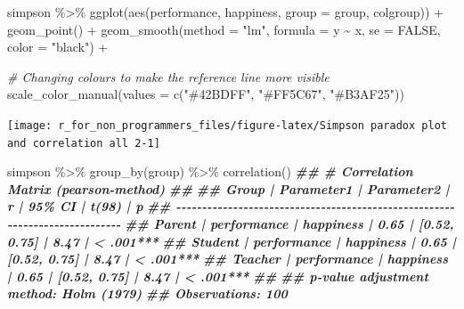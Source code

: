 \documentclass[
]{book}
\newenvironment{Shaded}{\begin{snugshade}}{\end{snugshade}}
\newcommand{\AttributeTok}[1]{\textcolor[rgb]{0.77,0.63,0.00}{#1}}
\newcommand{\CommentTok}[1]{\textcolor[rgb]{0.56,0.35,0.01}{\textit{#1}}}
\newcommand{\ConstantTok}[1]{\textcolor[rgb]{0.00,0.00,0.00}{#1}}
\newcommand{\DocumentationTok}[1]{\textcolor[rgb]{0.56,0.35,0.01}{\textbf{\textit{#1}}}}
\newcommand{\FunctionTok}[1]{\textcolor[rgb]{0.00,0.00,0.00}{#1}}
\newcommand{\NormalTok}[1]{#1}
\newcommand{\SpecialCharTok}[1]{\textcolor[rgb]{0.00,0.00,0.00}{#1}}
\newcommand{\StringTok}[1]{\textcolor[rgb]{0.31,0.60,0.02}{#1}}
\begin{document}
\begin{Shaded}
\begin{Highlighting}[]
\NormalTok{simpson }\SpecialCharTok{\%\textgreater{}\%}
  \FunctionTok{ggplot}\NormalTok{(}\FunctionTok{aes}\NormalTok{(performance, happiness, }\AttributeTok{group =}\NormalTok{ group, colgroup)) }\SpecialCharTok{+}
  \FunctionTok{geom\_point}\NormalTok{() }\SpecialCharTok{+}
  \FunctionTok{geom\_smooth}\NormalTok{(}\AttributeTok{method =} \StringTok{"lm"}\NormalTok{,}
              \AttributeTok{formula =}\NormalTok{ y }\SpecialCharTok{\textasciitilde{}}\NormalTok{ x,}
              \AttributeTok{se =} \ConstantTok{FALSE}\NormalTok{,}
              \AttributeTok{color =} \StringTok{"black"}\NormalTok{) }\SpecialCharTok{+}

  \CommentTok{\# Changing colours to make the reference line more visible}
  \FunctionTok{scale\_color\_manual}\NormalTok{(}\AttributeTok{values =} \FunctionTok{c}\NormalTok{(}\StringTok{"\#42BDFF"}\NormalTok{, }\StringTok{"\#FF5C67"}\NormalTok{, }\StringTok{"\#B3AF25"}\NormalTok{))}
\end{Highlighting}
\end{Shaded}

\begin{center}\texttt{[image: r\_for\_non\_programmers\_files/figure-latex/Simpson paradox plot and correlation all 2-1]} \end{center}

\begin{Shaded}
\begin{Highlighting}[]
\NormalTok{simpson }\SpecialCharTok{\%\textgreater{}\%}
  \FunctionTok{group\_by}\NormalTok{(group) }\SpecialCharTok{\%\textgreater{}\%}
  \FunctionTok{correlation}\NormalTok{()}
\DocumentationTok{\#\# \# Correlation Matrix (pearson{-}method)}
\DocumentationTok{\#\# }
\DocumentationTok{\#\# Group   |  Parameter1 | Parameter2 |    r |       95\% CI | t(98) |         p}
\DocumentationTok{\#\# {-}{-}{-}{-}{-}{-}{-}{-}{-}{-}{-}{-}{-}{-}{-}{-}{-}{-}{-}{-}{-}{-}{-}{-}{-}{-}{-}{-}{-}{-}{-}{-}{-}{-}{-}{-}{-}{-}{-}{-}{-}{-}{-}{-}{-}{-}{-}{-}{-}{-}{-}{-}{-}{-}{-}{-}{-}{-}{-}{-}{-}{-}{-}{-}{-}{-}{-}{-}{-}{-}{-}{-}{-}{-}{-}{-}}
\DocumentationTok{\#\# Parent  | performance |  happiness | 0.65 | [0.52, 0.75] |  8.47 | \textless{} .001***}
\DocumentationTok{\#\# Student | performance |  happiness | 0.65 | [0.52, 0.75] |  8.47 | \textless{} .001***}
\DocumentationTok{\#\# Teacher | performance |  happiness | 0.65 | [0.52, 0.75] |  8.47 | \textless{} .001***}
\DocumentationTok{\#\# }
\DocumentationTok{\#\# p{-}value adjustment method: Holm (1979)}
\DocumentationTok{\#\# Observations: 100}
\end{Highlighting}
\end{Shaded}
\end{document}
